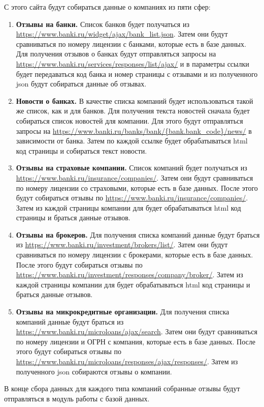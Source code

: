 \documentclass[PI, VKR]{HSEUniversity}
\begin{document}
С этого сайта будут собираться данные о компаниях из пяти сфер:
\begin{enumerate}
\item \textbf{Отзывы на банки.}
Список банков будет получаться из \url{https://www.banki.ru/widget/ajax/bank\_list.json}. Затем они будут сравниваться по номеру лицензии с банками, которые есть в базе данных. Для получения отзывов о банках будут отправляться запросы на \url{https://www.banki.ru/services/responses/list/ajax/} и в параметры ссылки будет передаваться код банка и номер страницы с отзывами и из полученного json будут собираться данные об отзывах.
\item \textbf{Новости о банках.}
В качестве списка компаний будет использоваться такой же список, как и для банков. Для получения текста новостей сначала будет собираться список новостей для компании. Для этого будут отправляться запросы на \url{https://www.banki.ru/banks/bank/\{bank.bank\_code\}/news/} в зависимости от банка. Затем по каждой ссылке будет обрабатываться html код страницы и собираться текст новости.
\item \textbf{Отзывы на страховые компании.}
Список компаний будет получаться из \url{https://www.banki.ru/insurance/companies/}. Затем они будут сравниваться по номеру лицензии со страховыми, которые есть в базе данных. После этого будут собираться отзывы по \url{https://www.banki.ru/insurance/companies/}. Затем из каждой страницы компании для будет обрабатываться html код страницы и браться данные отзывов.
\item \textbf{Отзывы на брокеров.}
Для получения списка компаний данные будут браться из \url{https://www.banki.ru/investment/brokers/list/}. Затем они будут сравниваться по номеру лицензии с брокерами, которые есть в базе данных. После этого будут собираться отзывы по \url{https://www.banki.ru/investment/responses/company/broker/}. Затем из каждой страницы компании для будет обрабатываться html код страницы и браться данные отзывов.
\item \textbf{Отзывы на микрокредитные организации.}
Для получения списка компаний данные будут браться из \url{https://www.banki.ru/microloans/ajax/search}. Затем они будут сравниваться по номеру лицензии и ОГРН с компания, которые есть в базе данных. После этого будут собираться отзывы по \url{https://www.banki.ru/microloans/responses/ajax/responses/}. Затем из полученного json собираются отзывы о компании.
\end{enumerate}
В конце сбора данных для каждого типа компаний собранные отзывы будут отправляться в модуль работы с базой данных.
\end{document}
